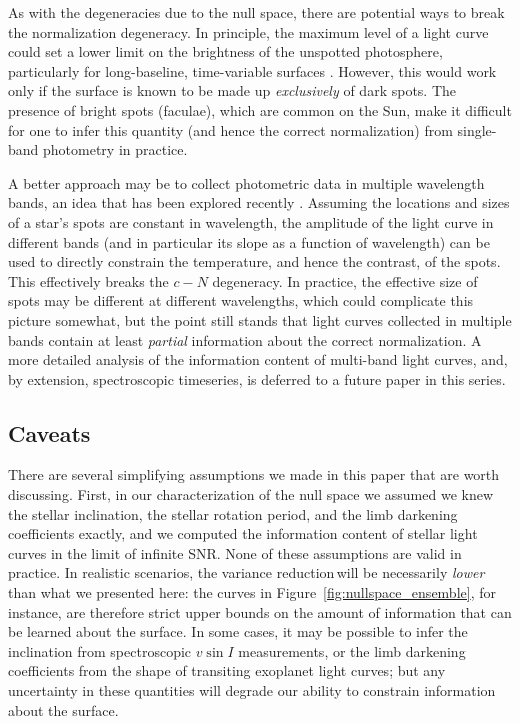 \documentclass[modern]{aastex62}
\newcommand{\shrinkage}{{variance reduction\,}}
\begin{document}

As with the degeneracies due to the null space, there are potential ways
to break the normalization degeneracy.
%
In principle, the maximum level of a light curve could set a lower limit on
the brightness of the
unspotted photosphere, particularly for long-baseline, time-variable
surfaces \citep{Basri2018}. However, this would work only if the surface is
known to be made up \emph{exclusively} of dark spots. The presence of bright
spots (faculae), which are common on the Sun, make it difficult
for one to infer this quantity (and hence the correct normalization)
from single-band photometry in practice.

A better approach may be to collect photometric data in
multiple wavelength bands, an idea that has
been explored recently \citep[e.g.,][]{Gully2017,Guo2018}. Assuming the
locations and sizes of a star's spots are constant in wavelength, the amplitude
of the light curve in different bands (and in particular its slope as a function
of wavelength) can be used to directly constrain the
temperature, and hence the contrast, of the spots. This effectively breaks the
$c-N$ degeneracy. In practice, the effective size of spots may be different
at different wavelengths, which could complicate this picture somewhat, but
the point still stands that light curves collected in multiple bands
contain at least \emph{partial} information about the correct normalization.
%
A more detailed analysis of the information content of multi-band light curves,
and, by extension, spectroscopic timeseries, is deferred to a future paper
in this series.

\subsection{Caveats}
\label{sec:caveats}

There are several simplifying assumptions we made in this paper that
are worth discussing. First, in our characterization of the null space
we assumed we knew the stellar inclination, the stellar rotation period,
and the limb darkening coefficients
exactly, and we computed the information content of stellar light curves
in the limit of infinite SNR. None of these assumptions are valid in
practice. In realistic scenarios, the \shrinkage will be
necessarily \emph{lower} than what we presented here: the curves in
Figure~\ref{fig:nullspace_ensemble}, for instance, are therefore
strict upper bounds on the amount of information that can be learned about
the surface. In some cases, it may be possible to infer the inclination
from spectroscopic $v \sin I$ measurements, or the limb darkening coefficients
from the shape of transiting exoplanet light curves; but any uncertainty
in these quantities will degrade our ability to constrain
information about the surface.
\end{document}
